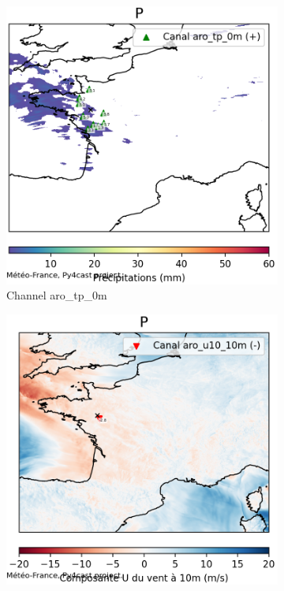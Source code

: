\begin{figure}[h]
    \centering
    \begin{subfigure}[b]{0.49\textwidth}
        \includegraphics[width=\textwidth]{Images/titan_rain_anchors/nov-16/2023111600_feature_aro_tp_0m.png}
        \caption{Channel aro\_tp\_0m}
    \end{subfigure}
    \hfill
    \begin{subfigure}[b]{0.49\textwidth}
        \includegraphics[width=\textwidth]{Images/titan_rain_anchors/nov-16/2023111600_feature_aro_u10_10m.png}

\end{subfigure}
\end{figure}
